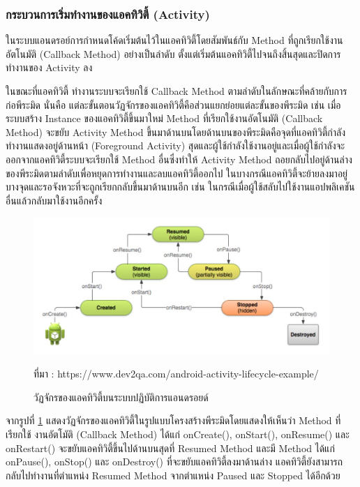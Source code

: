 	\subsubsection{กระบวนการเริ่มทำงานของแอคทิวิตี้ (Activity)} 
	ในระบบแอนดรอย์การกำหนดโค้ดเริ่มต้นไว้ในแอคทิวิตี้โดยสัมพันธ์กับ Method ที่ถูกเรียกใช้งานอัตโนมัติ (Callback Method) อย่างเป็นลำดับ ตั้งแต่เริ่มต้นแอคทิวิตี้ไปจนถึงสิ้นสุดและปิดการทำงานของ Activity ลง

	ในขณะที่แอคทิวิตี้ \cite{ActivityLifeCycle} ทำงานระบบจะเรียกใช้ Callback Method ตามลำดับในลักษณะที่คล้ายกับการก่อพีระมิด นั่นคือ แต่ละขั้นตอนวัฏจักรของแอคทิวิตี้คือส่วนแยกย่อยแต่ละขั้นของพีระมิด
	เช่น เมื่อระบบสร้าง Instance ของแอคทิวิตี้ขึ้นมาใหม่ Method ที่เรียกใช้งานอัตโนมัติ (Callback Method) จะขยับ Activity Method ขึ้นมาด้านบนโดยด้านบนของพีระมิดคือจุดที่แอคทิวิตี้กำลังทำงานแสดงอยู่ด้านหน้า (Foreground Activity) สุดและผู้ใช้กำลังใช้งานอยู่และเมื่อผู้ใช้กำลังจะออกจากแอคทิวิตี้ระบบจะเรียกใช้ Method อื่นซึ่งทำให้ Activity Method
	ถอยกลับไปอยู่ด้านล่างของพีระมิดตามลำดับเพื่อหยุดการทำงานและลบแอคทิวิตี้ออกไป ในบางกรณีแอคทิวิตี้จะย้ายลงมาอยู่บางจุดและรอจังหวะที่จะถูกเรียกกลับขึ้นมาด้านบนอีก เช่น ในกรณีเมื่อผู้ใช้สลับไปใช้งานแอปพลิเคชันอื่นแล้วกลับมาใช้งานอีกครั้ง
	
	\begin{figure}[H]
		\centering
		\includegraphics[width=0.8\columnwidth]{Figures/2/lifecycle}
		\caption{วัฏจักรของแอคทิวิตี้บนระบบปฏิบัติการแอนดรอยด์}{ที่มา : https://www.dev2qa.com/android-activity-lifecycle-example/}
		\label{Fig:lifecycle}
	\end{figure}

	จากรูปที่ \ref{Fig:lifecycle} แสดงวัฏจักรของแอคทิวิตี้ในรูปแบบโครงสร้างพีระมิดโดยแสดงให้เห็นว่า Method ที่เรียกใช้
	งานอัตโมัติ (Callback Method) ได้แก่ onCreate(), onStart(), onResume() และ onRestart() จะขยับแอคทิวิตี้ขึ้นไปด้านบนสุดที่ Resumed Method
	และมี Method ได้แก่ onPause(), onStop() และ onDestroy() ที่จะขยับแอคทิวิตี้ลงมาด้านล่าง แอคทิวิตี้ยังสามารถกลับไปทำงานที่ตำแหน่ง Resumed Method จากตำแหน่ง Paused และ Stopped ได้อีกด้วย
	
